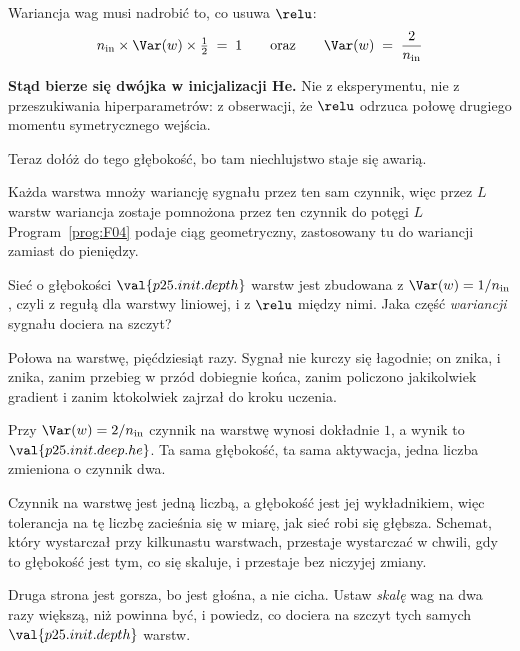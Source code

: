 \begin{fr}

Wariancja wag musi nadrobić to, co usuwa $\relu$:
\[ n_{\text{in}} \times \Var(w) \times \tfrac{1}{2} \;=\; 1
   \qquad\text{oraz}\qquad \Var(w) \;=\; \frac{2}{n_{\text{in}}} \]

\textbf{Stąd bierze się dwójka w inicjalizacji He.} Nie z eksperymentu, nie z
przeszukiwania hiperparametrów: z obserwacji, że $\relu$ odrzuca połowę
drugiego momentu symetrycznego wejścia.
\end{fr}

\begin{fr}
Teraz dołóż do tego głębokość, bo tam niechlujstwo staje się awarią.

Każda warstwa mnoży wariancję sygnału przez ten sam czynnik, więc przez $L$
warstw wariancja zostaje pomnożona przez ten czynnik do potęgi $L$ \dash{}
Program~\ref{prog:F04} podaje ciąg geometryczny, zastosowany tu do wariancji
zamiast do pieniędzy.

Sieć o głębokości $\val{p25.init.depth}$ warstw jest zbudowana z
$\Var(w) = 1/n_{\text{in}}$, czyli z regułą dla warstwy liniowej, i z $\relu$
między nimi. Jaka część \emph{wariancji} sygnału dociera na szczyt?
\dotline
\nextframe
\end{fr}

\begin{fr}

Połowa na warstwę, pięćdziesiąt razy. Sygnał nie kurczy się łagodnie; on
znika, i znika, zanim przebieg w przód dobiegnie końca, zanim policzono
jakikolwiek gradient i zanim ktokolwiek zajrzał do kroku uczenia.

Przy $\Var(w) = 2/n_{\text{in}}$ czynnik na warstwę wynosi dokładnie $1$, a
wynik to $\val{p25.init.deep.he}$. Ta sama głębokość, ta sama aktywacja, jedna
liczba zmieniona o czynnik dwa.
\end{fr}

\begin{fr}

Czynnik na warstwę jest jedną liczbą, a głębokość jest jej wykładnikiem, więc
tolerancja na tę liczbę zacieśnia się w miarę, jak sieć robi się głębsza.
Schemat, który wystarczał przy kilkunastu warstwach, przestaje wystarczać w
chwili, gdy to głębokość jest tym, co się skaluje, i przestaje bez niczyjej
zmiany.

Druga strona jest gorsza, bo jest głośna, a nie cicha. Ustaw \emph{skalę} wag
na dwa razy większą, niż powinna być, i powiedz, co dociera na szczyt tych
samych $\val{p25.init.depth}$ warstw.
\dotline
\nextframe
\end{fr}

